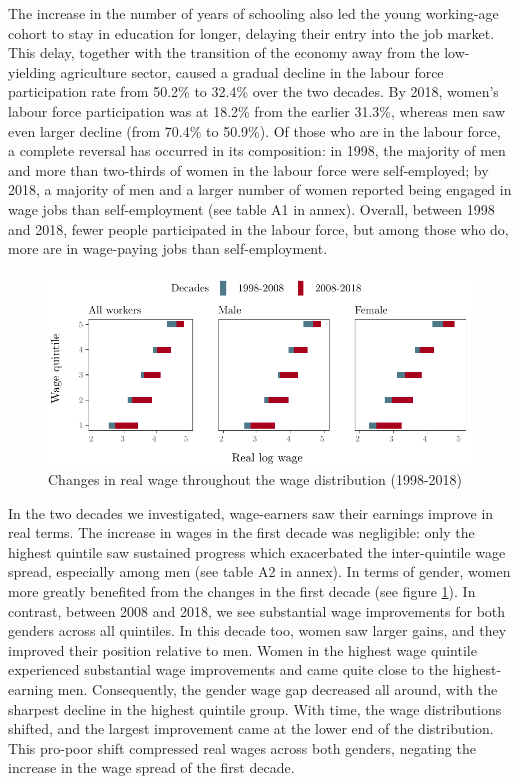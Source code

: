 % 
	
The increase in the number of years of schooling also led the young working-age cohort to stay in education for longer, delaying their entry into the job market. This delay, together with the transition of the economy away from the low-yielding agriculture sector, caused a gradual decline in the labour force participation rate from 50.2\% to 32.4\% over the two decades. By 2018, women’s labour force participation was at 18.2\% from the earlier 31.3\%, whereas men saw even larger decline (from 70.4\% to 50.9\%). Of those who are in the labour force, a complete reversal has occurred in its composition: in 1998, the majority of men and more than two-thirds of women in the labour force were self-employed; by 2018, a majority of men and a larger number of women reported being engaged in wage jobs than self-employment (see table A1 in annex). Overall, between 1998 and 2018, fewer people participated in the labour force, but among those who do, more are in wage-paying jobs than self-employment.\par    

\begin{figure}[htb] 
	\centering
	\includegraphics{./figure/log_real_wage_change_NLFS_all}
	\caption{Changes in real wage throughout the wage distribution (1998-2018)}
	\label{fig:wagechangeAll}
\end{figure} 

In the two decades we investigated, wage-earners saw their earnings improve in real terms. The increase in wages in the first decade was negligible: only the highest quintile saw sustained progress which exacerbated the inter-quintile wage spread, especially among men (see table A2 in annex). In terms of gender, women more greatly benefited from the changes in the first decade (see figure \ref{fig:wagechangeAll}). In contrast, between 2008 and 2018, we see substantial wage improvements for both genders across all quintiles. In this decade too, women saw larger gains, and they improved their position relative to men. Women in the highest wage quintile experienced substantial wage improvements and came quite close to the highest-earning men. Consequently, the gender wage gap decreased all around, with the sharpest decline in the highest quintile group. With time, the wage distributions shifted, and the largest improvement came at the lower end of the distribution. This pro-poor shift compressed real wages across both genders, negating the increase in the wage spread of the first decade.\par

